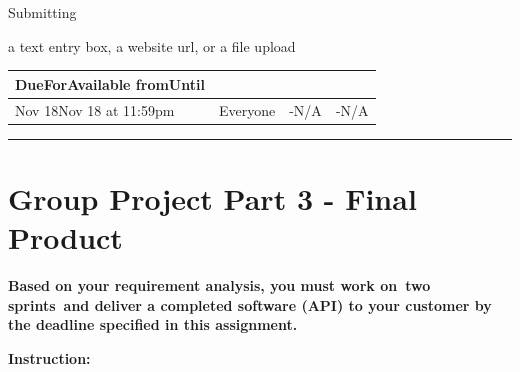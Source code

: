 \documentclass[
]{article}
\begin{document}
Submitting

a text entry box, a website url, or a file upload

\begin{longtable}[]{@{}llll@{}}
\toprule\noalign{}
DueForAvailable fromUntil & & & \\
\midrule\noalign{}
\endhead
\bottomrule\noalign{}
\endlastfoot
Nov 18Nov 18 at 11:59pm & Everyone & -N/A & -N/A \\
\end{longtable}

\begin{center}\rule{0.5\linewidth}{0.5pt}\end{center}

\section{Group Project Part 3 - Final
Product}\label{group-project-part-3---final-product}

\textbf{Based on your requirement analysis, you must work on~two
sprints~and deliver a completed software (API) to your customer by the
deadline specified in this assignment.}

\textbf{Instruction:}
\end{document}
